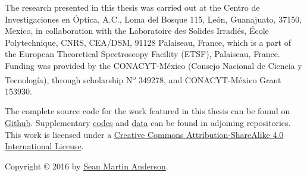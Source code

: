 \begin{titlingpage*}

\let\cleardoublepage\clearpage

\null
\vfill
\parbox{0.7\textwidth}{
The research presented in this thesis was carried out at the Centro de
Investigaciones en \'Optica, A.C., Loma del Bosque 115, Le\'on, Guanajuato,
37150, Mexico, in collaboration with the Laboratoire des Solides Irradi\'es,
\'Ecole Polytechnique, CNRS, CEA/DSM, 91128 Palaiseau, France, which is a part
of the European Theoretical Spectroscopy Facility (ETSF), Palaiseau, France.
Funding was provided by the CONACYT-M\'exico (Consejo Nacional de Ciencia y
Tecnolog\'ia), through scholarship N\textsuperscript{o} 349278, and
CONACYT-M\'exico Grant 153930.

\vspace{0.5cm}

The complete source code for the work featured in this thesis can be found on
\href{https://github.com/roguephysicist/phd-thesis}{Github}. Supplementary
\href{https://github.com/roguephysicist/SHGYield}{codes} and
\href{https://github.com/roguephysicist/shg-si-surfaces}{data} can be found in
adjoining repositories. This work is licensed under a
\href{http://creativecommons.org/licenses/by-sa/4.0/}{Creative Commons
Attribution-ShareAlike 4.0 International License}.



\vspace{0.5cm}

Copyright {\copyright{}} 2016 by 
\href{mailto:sean.martin.anderson@gmail.com}{Sean Martin Anderson}.
}

\end{titlingpage*}
